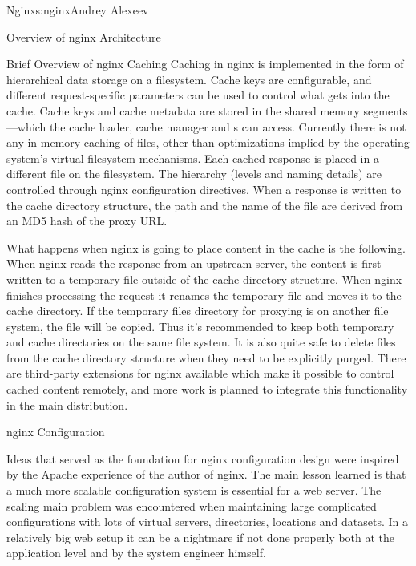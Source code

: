 \begin{aosachapter}{Nginx}{s:nginx}{Andrey Alexeev}
\begin{aosasect1}{Overview of nginx Architecture}
\begin{aosasect2}{Brief Overview of nginx Caching}
Caching in nginx is implemented in the form of hierarchical data
storage on a filesystem. Cache keys are configurable, and different
request-specific parameters can be used to control what gets into the
cache. Cache keys and cache metadata are stored in the shared memory
segments---which the cache loader, cache manager and s
can access. Currently there is not any in-memory caching of files,
other than optimizations implied by the operating system's virtual
filesystem mechanisms. Each cached response is placed in a different
file on the filesystem. The hierarchy (levels and naming details) are
controlled through nginx configuration directives. When a response is
written to the cache directory structure, the path and the name of the
file are derived from an MD5 hash of the proxy URL.

What happens when nginx is going to place content in the cache is the
following. When nginx reads the response from an upstream server, the
content is first written to a temporary file outside of the cache
directory structure. When nginx finishes processing the request it
renames the temporary file and moves it to the cache directory. If the
temporary files directory for proxying is on another file system, the
file will be copied. Thus it's recommended to keep both temporary and
cache directories on the same file system. It is also quite safe to
delete files from the cache directory structure when they need to be
explicitly purged. There are third-party extensions for nginx
available which make it possible to control cached content remotely,
and more work is planned to integrate this functionality in the main
distribution.

\end{aosasect2}

\end{aosasect1}

\begin{aosasect1}{nginx Configuration}

Ideas that served as the foundation for nginx configuration design
were inspired by the Apache experience of the author of nginx. The
main lesson learned is that a much more scalable configuration system
is essential for a web server. The scaling main problem was
encountered when maintaining large complicated configurations with
lots of virtual servers, directories, locations and datasets. In a
relatively big web setup it can be a nightmare if not done properly
both at the application level and by the system engineer himself.


\end{aosasect1}
\end{aosachapter}
